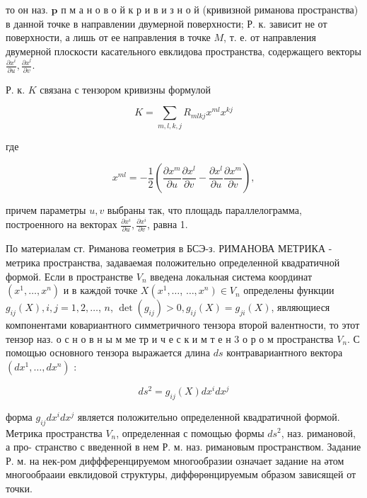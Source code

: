 \documentclass[10pt]{article}
\begin{document}
то он наз. $\mathbf{p}$ п м а н о в о й к р и в и з н о й (кривизной риманова пространства) в данной точке в направлении двумерной поверхности; Р. к. зависит не от поверхности, а лишь от ее направления в точке $M$, т. е. от направления двумерной плоскости касательного евклидова пространства, содержащего векторы $\frac{\partial x^{i}}{\partial u}, \frac{\partial x^{l}}{\partial v}$.



Р. к. $K$ связана с тензором кривизны формулой



\[

K=\sum_{m, l, k, j} R_{m l k j} x^{m l} x^{k j}

\]



где



\[

x^{m l}=-\frac{1}{2}\left(\frac{\partial x^{m}}{\partial u} \frac{\partial x^{l}}{\partial v}-\frac{\partial x^{l}}{\partial u} \frac{\partial x^{m}}{\partial v}\right),

\]



причем параметры $u, v$ выбраны так, что площадь параллелограмма, построенного на векторах $\frac{\partial x^{i}}{\partial u}, \frac{\partial x^{i}}{\partial v}$, равна 1.



По материалам ст. Риманова геометрия в БСЭ-з. РИМАНОВА МЕТРИКА - метрика пространства, задаваемая положительно определенной квадратичной формой. Если в пространстве $V_{n}$ введена локальная система координат $\left(x^{1}, \ldots, x^{n}\right)$ и в каждой точке $X\left(x^{1}, \ldots\right.$, $\left.\ldots, x^{n}\right) \in V_{n}$ определены функции $g_{i j}(X), i, j=1,2, \ldots$, $n$, $\operatorname{det}\left(g_{i j}\right)>0, g_{i j}(X)=g_{j i}(X)$, являющиеся компонентами ковариантного симметричного тензора второй валентности, то этот тензор наз. о с н о в н ы м ме тр и ч е с к и м т е н 3 о р о м пространства $V_{n}$. С помощью основного тензора выражается длина $d s$ контравариантного вектора $\left(d x^{1}, \ldots, d x^{n}\right)$ :



\[

d s^{2}=g_{i j}(X) d x^{i} d x^{j}

\]



форма $g_{i j} d x^{i} d x^{j}$ является положительно определенной квадратичной формой. Метрика пространства $V_{n}$, определенная с помощью формы $d s^{2}$, наз. римановой, а про- странство с введенной в нем Р. м. наз. римановым пространством. Задание Р. м. на нек-ром диффференцируемом многообразии означает задание на әтом многообрааии евклидовой структуры, диффөрөнцируемым образом зависящей от точки.
\end{document}
